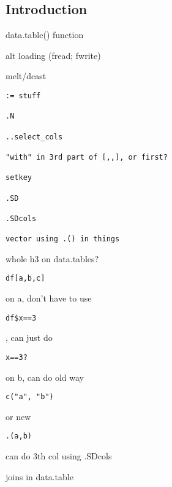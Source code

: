 
\subsection{Introduction}

data.table() function

alt loading (fread; fwrite)

melt/dcast
\begin{verbatim}
:= stuff

.N

..select_cols

"with" in 3rd part of [,,], or first?

setkey

.SD

.SDcols

vector using .() in things
\end{verbatim}
whole h3 on data.tables?

\begin{verbatim}
df[a,b,c]
\end{verbatim}

on a, don't have to use 
\begin{verbatim}
df$x==3
\end{verbatim}
, can just do 
\begin{verbatim}
x==3?
\end{verbatim}

on b, can do old way

\begin{verbatim}
c("a", "b")
\end{verbatim}
or new
\begin{verbatim}
.(a,b)
\end{verbatim}
can do 3th col using .SDcols



joins in data.table

